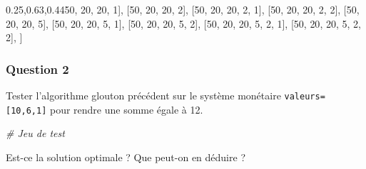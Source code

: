 \documentclass[
  paper=a4,
  ,captions=tableheading
]{scrartcl}
\newenvironment{Shaded}{}{}
\newcommand{\CommentTok}[1]{\textcolor[rgb]{0.38,0.63,0.69}{\textit{#1}}}
\newcommand{\DecValTok}[1]{\textcolor[rgb]{0.25,0.63,0.44}{#1}}
\newcommand{\NormalTok}[1]{#1}
\begin{document}
\begin{Shaded}
\begin{Highlighting}[]
\NormalTok{    [}\DecValTok{50}\NormalTok{, }\DecValTok{20}\NormalTok{, }\DecValTok{20}\NormalTok{, }\DecValTok{1}\NormalTok{],}
\NormalTok{    [}\DecValTok{50}\NormalTok{, }\DecValTok{20}\NormalTok{, }\DecValTok{20}\NormalTok{, }\DecValTok{2}\NormalTok{],}
\NormalTok{    [}\DecValTok{50}\NormalTok{, }\DecValTok{20}\NormalTok{, }\DecValTok{20}\NormalTok{, }\DecValTok{2}\NormalTok{, }\DecValTok{1}\NormalTok{],}
\NormalTok{    [}\DecValTok{50}\NormalTok{, }\DecValTok{20}\NormalTok{, }\DecValTok{20}\NormalTok{, }\DecValTok{2}\NormalTok{, }\DecValTok{2}\NormalTok{],}
\NormalTok{    [}\DecValTok{50}\NormalTok{, }\DecValTok{20}\NormalTok{, }\DecValTok{20}\NormalTok{, }\DecValTok{5}\NormalTok{],}
\NormalTok{    [}\DecValTok{50}\NormalTok{, }\DecValTok{20}\NormalTok{, }\DecValTok{20}\NormalTok{, }\DecValTok{5}\NormalTok{, }\DecValTok{1}\NormalTok{],}
\NormalTok{    [}\DecValTok{50}\NormalTok{, }\DecValTok{20}\NormalTok{, }\DecValTok{20}\NormalTok{, }\DecValTok{5}\NormalTok{, }\DecValTok{2}\NormalTok{],}
\NormalTok{    [}\DecValTok{50}\NormalTok{, }\DecValTok{20}\NormalTok{, }\DecValTok{20}\NormalTok{, }\DecValTok{5}\NormalTok{, }\DecValTok{2}\NormalTok{, }\DecValTok{1}\NormalTok{],}
\NormalTok{    [}\DecValTok{50}\NormalTok{, }\DecValTok{20}\NormalTok{, }\DecValTok{20}\NormalTok{, }\DecValTok{5}\NormalTok{, }\DecValTok{2}\NormalTok{, }\DecValTok{2}\NormalTok{],}
\NormalTok{]}
\end{Highlighting}
\end{Shaded}

\hypertarget{question-2}{%
\subsubsection{Question 2}\label{question-2}}

Tester l'algorithme glouton précédent sur le système monétaire
\texttt{valeurs={[}10,6,1{]}} pour rendre une somme égale à 12.

\begin{Shaded}
\begin{Highlighting}[]

\end{Highlighting}
\end{Shaded}

\begin{Shaded}
\begin{Highlighting}[]
\CommentTok{\# Jeu de test}
\end{Highlighting}
\end{Shaded}

Est-ce la solution optimale ? Que peut-on en déduire ?
\end{document}
